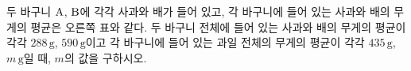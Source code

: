\noindent\begin{minipage}[t]{0.58\linewidth}\vspace{0pt}\raggedright 두 바구니 $\mathrm{A}$, $\mathrm{B}$에 각각 사과와 배가 들어 있고, 각 바구니에 들어 있는 사과와 배의 무게의 평균은 오른쪽 표와 같다. 두 바구니 전체에 들어 있는 사과와 배의 무게의 평균이 각각 $288\,\mathrm{g}$, $590\,\mathrm{g}$이고 각 바구니에 들어 있는 과일 전체의 무게의 평균이 각각 $435\,\mathrm{g}$, $m\,\mathrm{g}$일 때, $m$의 값을 구하시오.\end{minipage}\hfill\begin{minipage}[t]{0.4\linewidth}\vspace{0pt}\centering \resizebox{\ifdim\width>\linewidth\linewidth\else\width\fi}{!}{}\end{minipage}\par
